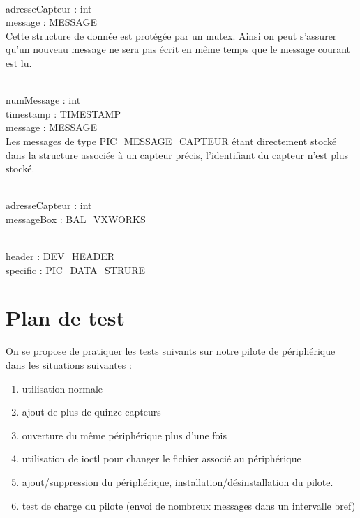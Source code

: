 \begin{m_desc}
 \item [PIC\_BUFFER\_CARTE] \hfill\\
adresseCapteur : int\\
message   : MESSAGE\\

Cette structure de donnée est protégée par un mutex. Ainsi on peut s'assurer qu'un nouveau message ne sera pas écrit en même temps que le message courant est lu.

 \item [PIC\_MESSAGE\_CAPTEUR] \hfill\\
numMessage : int\\
timestamp  : TIMESTAMP\\
message    : MESSAGE\\

Les messages de type PIC\_MESSAGE\_CAPTEUR étant directement stocké dans la structure associée à un capteur précis, l'identifiant du capteur n'est plus stocké.

\item [PIC\_DATA\_STRUCTURE] \hfill\\
adresseCapteur  : int\\
messageBox : BAL\_VXWORKS\\

\item [PIC\_HEADER] \hfill\\
header     : DEV\_HEADER\\
specific   : PIC\_DATA\_STRURE\\

\end{m_desc}

\section{Plan de test}

On se propose de pratiquer les tests suivants sur notre pilote de périphérique dans les situations suivantes :

\begin{enumerate}
 \item utilisation normale
 \item ajout de plus de quinze capteurs
 \item ouverture du même périphérique plus d'une fois
 \item utilisation de ioctl pour changer le fichier associé au périphérique
 \item ajout/suppression du périphérique, installation/désinstallation du pilote.
 \item test de charge du pilote (envoi de nombreux messages dans un intervalle bref)
\end{enumerate}
